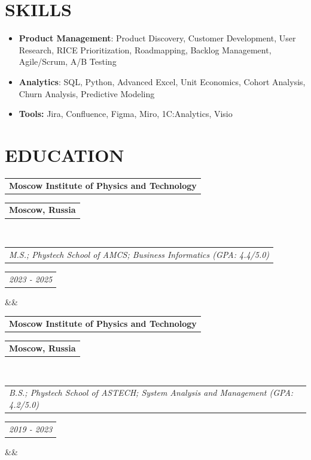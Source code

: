 \documentclass[11pt,a4paper,sans]{moderncv}        %
\makeatletter
\newcommand*{\customcventry}[7][.25em]{
  \begin{tabular}{@{}l} 
    {\bfseries #4}
  \end{tabular}
  \hfill%
  \begin{tabular}{l@{}}
     {\bfseries #5}
  \end{tabular} \\
  \begin{tabular}{@{}l} 
    {\itshape #3}
  \end{tabular}
  \hfill%
  \begin{tabular}{l@{}}
     {\itshape #2}
  \end{tabular}
  \ifx&#7&%
  \else{\\%
    \begin{minipage}{\maincolumnwidth}%
      \small#7%
    \end{minipage}}\fi%
  \par\addvspace{#1}}
\makeatother
\begin{document}
\section{SKILLS}
\begin{itemize}
\item \textbf{Product Management}: Product Discovery, Customer Development, User Research, RICE Prioritization, Roadmapping, Backlog Management, Agile/Scrum, A/B Testing
\item \textbf{Analytics}: SQL, Python, Advanced Excel, Unit Economics, Cohort Analysis, Churn Analysis, Predictive Modeling
\item \textbf{Tools:} Jira, Confluence, Figma, Miro, 1C:Analytics, Visio
\end{itemize}

\section{EDUCATION}
{\customcventry{2023 - 2025}{M.S.; Phystech School of AMCS; Business Informatics (GPA: 4.4/5.0)}{Moscow Institute of Physics and Technology}{Moscow, Russia}{}{}}
{\customcventry{2019 - 2023}{B.S.; Phystech School of ASTECH; System Analysis and Management (GPA: 4.2/5.0)}{Moscow Institute of Physics and Technology}{Moscow, Russia}{}{}}





\end{document}
